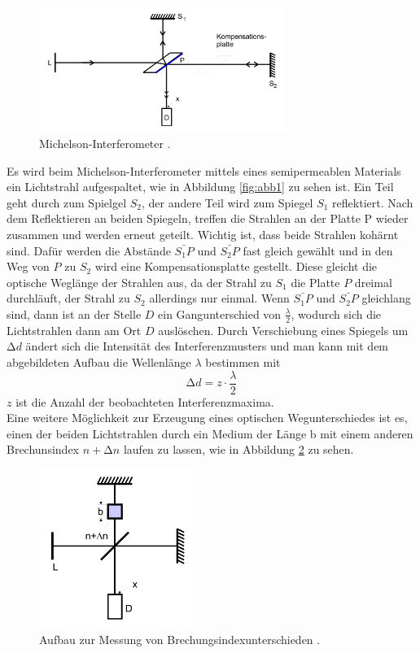 \begin{figure}
    \centering
    \includegraphics[width=8cm]{data/abb2.png}
    \caption{Michelson-Interferometer \cite{sample}.}
    \label{fig:abb2}
\end{figure}
\FloatBarrier
Es wird beim Michelson-Interferometer mittels eines semipermeablen Materials ein Lichtstrahl aufgespaltet, wie in Abbildung \ref{fig:abb1} zu sehen ist.
Ein Teil geht durch zum Spielgel $S_2$, der andere Teil wird zum Spiegel $S_1$ reflektiert.
Nach dem Reflektieren an beiden Spiegeln, treffen die Strahlen an der Platte P wieder zusammen und werden erneut geteilt.
Wichtig ist, dass beide Strahlen kohärnt sind.
Dafür werden die Abstände $\bar{S_1P} \text{ und } \bar{S_2P}$ fast gleich gewählt und in den Weg von $P$ zu $S_2$ wird eine Kompensationsplatte gestellt.
Diese gleicht die optische Weglänge der Strahlen aus, da der Strahl zu $S_1$ die Platte $P$ dreimal durchläuft, der Strahl zu $S_2$ allerdings nur einmal.
Wenn $\bar{S_1P} \text{ und } \bar{S_2P}$ gleichlang sind, dann ist an der Stelle $D$ ein Gangunterschied von $\frac{\lambda}{2}$, wodurch sich die Lichtstrahlen dann am Ort $D$ auslöschen.
Durch Verschiebung eines Spiegels um $\increment d$ ändert sich die Intensität des Interferenzmusters und man kann mit dem abgebildeten Aufbau die Wellenlänge $\lambda$ bestimmen mit
\begin{equation}
    \increment d = z \cdot \frac{\lambda}{2}
    \label{eqn:gl1}
\end{equation}
$z$ ist die Anzahl der beobachteten Interferenzmaxima. \\
Eine weitere Möglichkeit zur Erzeugung eines optischen Wegunterschiedes ist es,
einen der beiden Lichtstrahlen durch ein Medium der Länge b mit einem anderen Brechunsindex $n + \increment n$ laufen zu lassen, wie in Abbildung \ref{fig:abb3} zu sehen.
\begin{figure}
    \centering
    \includegraphics[width=5cm]{data/abb3.png}
    \caption{Aufbau zur Messung von Brechungsindexunterschieden \cite{sample}.}
    \label{fig:abb3}
\end{figure}
